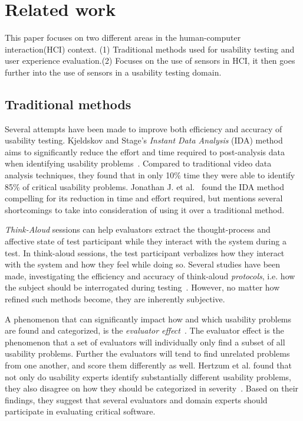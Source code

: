 \section{Related work}
This paper focuses on two different areas in the human-computer interaction(HCI) context. (1) Traditional methods used for usability testing and user experience evaluation.(2) Focuses on the use of sensors in HCI, it then goes further into the use of sensors in a usability testing domain.

\subsection{Traditional methods} %
Several attempts have been made to improve both efficiency and accuracy of
usability testing. Kjeldskov and Stage's \textit{Instant Data
Analysis} (IDA) method aims to significantly reduce the effort and time required
to post-analysis data when identifying usability
problems~\cite{instant_data_analysis}. Compared to traditional video data
analysis techniques, they found that in only 10\% time they were able to
identify 85\% of critical usability problems. Jonathan J. et
al.~\cite{use_of_TA_and_IDA} found the IDA
method compelling for its reduction in time and effort required, but mentions
several shortcomings to take into consideration of using it over a traditional
method.

\textit{Think-Aloud} sessions can help evaluators extract the thought-process
and affective state of test participant while they interact with the system
during a test. In think-aloud sessions, the test participant verbalizes how
they interact with the system and how they feel while doing so.  Several studies
have been made, investigating the efficiency and accuracy of think-aloud
\textit{protocols}, i.e. how the subject should be interrogated during
testing~\cite{two_think_aloud_protocols_study}. However, no matter how refined
such methods become, they are inherently subjective.

A phenomenon that can significantly impact how and which usability problems are
found and categorized, is the \textit{evaluator effect}~\cite{eval_effect}.
The evaluator effect is the phenomenon that a set of evaluators will individually only find a subset of all usability problems.
Further the evaluators will tend to find unrelated problems from one another, and score them differently as well.\cite{eval_effect}
Hertzum et al. found that not only do
usability experts identify substantially different usability problems, they also
disagree on how they should be categorized in
severity~\cite{eval_effect_research}. Based on their findings, they suggest that
several evaluators and domain experts should participate in evaluating critical
software.

